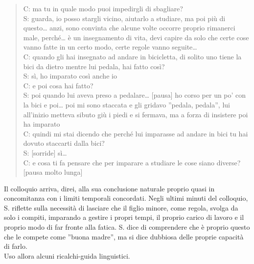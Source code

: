 \begin{verse}
C: ma tu in quale modo puoi impedirgli di sbagliare?\\
S: guarda, io posso stargli vicino, aiutarlo a studiare, ma poi più di questo\ldots{}   anzi, sono convinta che alcune volte occorre proprio rimanerci male, perché\ldots{}    è un insegnamento di vita, devi capire da solo che certe cose vanno fatte in un certo modo, certe regole vanno seguite\ldots{}   \\
C: quando gli hai insegnato ad andare in bicicletta, di solito uno tiene la bici da dietro mentre lui pedala, hai fatto così?\\
S: sì, ho imparato così anche io\\
C: e poi cosa hai fatto?\\
S: poi quando lui aveva preso a pedalare\ldots{}    [pausa] ho corso per un po' con la bici e poi\ldots{}    poi mi sono staccata e gli gridavo ''pedala, pedala'', lui all'inizio metteva sibuto giù i piedi e si fermava, ma a forza di insistere poi ha imparato\\
C: quindi mi stai dicendo che perché lui imparasse ad andare in bici tu hai dovuto staccarti dalla bici?\\
S: [sorride] sì\ldots{}   \\
C: e cosa ti fa pensare che per imparare a studiare le cose siano diverse?
[pausa molto lunga]
\end{verse}

\noindent Il colloquio arriva, direi, alla sua conclusione naturale proprio quasi in concomitanza con i limiti temporali concordati. Negli ultimi minuti del colloquio, S. riflette sulla necessità di lasciare che il figlio minore, come regola, svolga da solo i compiti, imparando a gestire i propri tempi, il proprio carico di lavoro e il proprio modo di far fronte alla fatica. S. dice di comprendere che è proprio questo che le compete come ''buona madre'', ma si dice dubbiosa delle proprie capacità di farlo.\\Uso allora alcuni ricalchi-guida linguistici.

